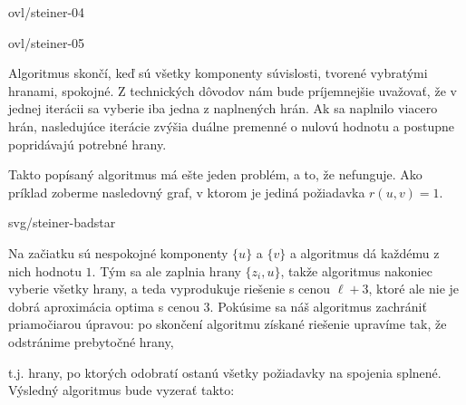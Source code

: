 
\begin{minipage}[t]{0.5\textwidth}
\vskip 0pt
\begin{myfig}{\textwidth}{ovl/steiner-04}
\end{myfig}
\end{minipage}
\begin{minipage}[t]{0.5\textwidth}
\vskip 0pt
\begin{myfig}{\textwidth}{ovl/steiner-05}
\end{myfig}
\end{minipage}

\noindent
Algoritmus skončí, keď sú všetky komponenty súvislosti, tvorené vybratými hranami, spokojné.
Z technických dôvodov nám bude príjemnejšie uvažovať, že v jednej iterácii sa vyberie iba jedna z 
naplnených hrán. Ak sa naplnilo viacero hrán, nasledujúce iterácie zvýšia duálne premenné o nulovú hodnotu
a postupne popridávajú potrebné hrany.

\noindent
Takto popísaný algoritmus má ešte jeden problém, a to, že nefunguje. 
Ako príklad zoberme nasledovný graf, v ktorom je jediná požiadavka $r(u,v)=1$.

\begin{minipage}[t]{0.4\textwidth}
  \vskip 0pt
\begin{myfig}{0.9\textwidth}{svg/steiner-badstar}
\end{myfig}
\end{minipage}
\hfill
\begin{minipage}[t]{0.5\textwidth}
  \vskip 0pt
  \noindent
  Na začiatku sú nespokojné komponenty $\{u\}$ a $\{v\}$ a algoritmus dá každému z nich hodnotu $1$. Tým sa ale
  zaplnia hrany $\{z_i,u\}$, takže algoritmus nakoniec vyberie všetky hrany, a teda vyprodukuje riešenie
  s cenou $\ell+3$,  ktoré ale nie je dobrá aproximácia optima s cenou $3$. Pokúsime sa náš algoritmus zachrániť
  priamočiarou úpravou: po skončení algoritmu získané riešenie upravíme tak, že odstránime prebytočné hrany, 
\end{minipage}


\noindent
  t.j.
  hrany, po ktorých odobratí ostanú všetky požiadavky na spojenia splnené.
  Výsledný algoritmus bude vyzerať takto:

